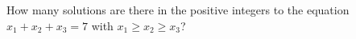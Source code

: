 \documentclass{book}
\begin{document}
\setcounter{cpjt}{209}
\addtocounter{cpjt}{-1}
\begin{activity}\label{activity-202}
\hypertarget{p-1126}{}%
How many solutions are there in the positive integers to the equation \(x_1+x_2+x_3 =7\) with \(x_1\ge x_2\ge x_3\)?%
\par\smallskip%
\noindent\end{activity}

\clearpage
\end{document}
